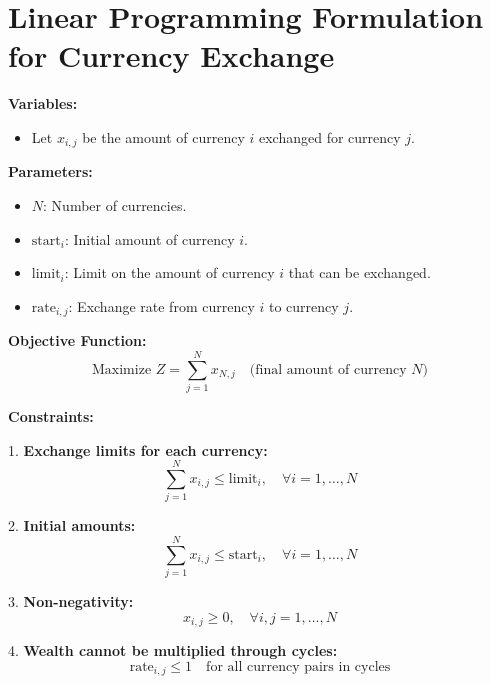 \documentclass{article}
\begin{document}
\section*{Linear Programming Formulation for Currency Exchange}

\textbf{Variables:}
\begin{itemize}
    \item Let \( x_{i,j} \) be the amount of currency \( i \) exchanged for currency \( j \).
\end{itemize}

\textbf{Parameters:}
\begin{itemize}
    \item \( N \): Number of currencies.
    \item \( \text{start}_i \): Initial amount of currency \( i \).
    \item \( \text{limit}_i \): Limit on the amount of currency \( i \) that can be exchanged.
    \item \( \text{rate}_{i,j} \): Exchange rate from currency \( i \) to currency \( j \).
\end{itemize}

\textbf{Objective Function:}
\[
\text{Maximize } Z = \sum_{j=1}^{N} x_{N,j} \quad \text{(final amount of currency } N\text{)}
\]

\textbf{Constraints:}

1. \textbf{Exchange limits for each currency:}
\[
\sum_{j=1}^{N} x_{i,j} \leq \text{limit}_i, \quad \forall i = 1, \ldots, N
\]

2. \textbf{Initial amounts:}
\[
\sum_{j=1}^{N} x_{i,j} \leq \text{start}_i, \quad \forall i = 1, \ldots, N
\]

3. \textbf{Non-negativity:}
\[
x_{i,j} \geq 0, \quad \forall i, j = 1, \ldots, N
\]

4. \textbf{Wealth cannot be multiplied through cycles:}
\[
\text{rate}_{i,j} \leq 1 \quad \text{for all currency pairs in cycles}
\]
\end{document}
